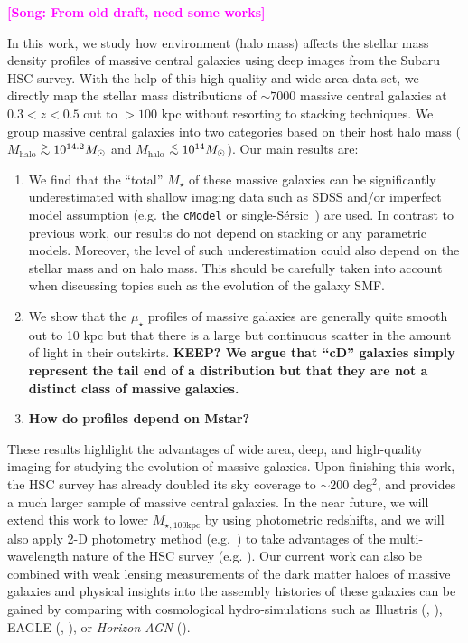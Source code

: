 \documentclass[a4paper,fleqn,usenatbib]{mnras}
\def\simlt{\lower.5ex\hbox{$\; \buildrel < \over {\sim} \;$}}
\def\simgt{\lower.5ex\hbox{$\; \buildrel > \over {\sim} \;$}}
\def\ser{{S\'{e}rsic\ }}
\def\mstar{{$M_{\star}$}}
\def\mhalo{{$M_{\mathrm{halo}}$}}
\def\mtot{{$M_{\star,100\mathrm{kpc}}$}}
\def\mden{{$\mu_{\star}$}}
\newcommand{\song}[1]{\textcolor{magenta}{\textbf{[Song: #1]}}}
\begin{document}
    \song{From old draft, need some works}
    
    In this work, we study how environment (halo mass) affects the stellar mass density 
    profiles of massive central galaxies using deep images from the Subaru HSC 
    survey. 
    With the help of this high-quality and wide area data set, we directly map the 
    stellar mass distributions of ${\sim}7000$ massive central galaxies at 
    $0.3 < z < 0.5$ out to $>100$ kpc without resorting to stacking techniques. 
    We group massive central galaxies into two categories based on their host halo 
    mass (\mhalo{}$\simgt 10^{14.2} M_{\odot}$ and \mhalo{}$\simlt 10^{14} M_{\odot}$). 
    Our main results are:  
    
    \begin{enumerate}
        \item We find that the ``total'' \mstar{} of these massive galaxies can be 
            significantly underestimated with shallow imaging data such as SDSS and/or 
            imperfect model assumption (e.g. the \texttt{cModel} or single-\ser{}) 
            are used. 
            In contrast to previous work, our results do not depend on stacking or any 
            parametric models. 
            Moreover, the level of such underestimation could also depend on the 
            stellar mass and on halo mass. 
            This should be carefully taken into account when discussing topics such 
            as the evolution of the galaxy SMF.
            
        \item We show that the \mden{} profiles of massive galaxies are generally quite 
            smooth out to 10 kpc but that there is a large but continuous scatter in the 
            amount of light in their outskirts. 
            {\bf KEEP? We argue that ``cD'' galaxies simply represent the tail end of a 
            distribution but that they are not a distinct class of massive galaxies.}
            
        \item {\bf How do profiles depend on Mstar?}
            
    \end{enumerate}

    These results highlight the advantages of wide area, deep, and high-quality imaging 
    for studying the evolution of massive galaxies. 
    Upon finishing this work, the HSC survey has already doubled its sky coverage to 
    ${\sim} 200$ deg$^2$, and provides a much larger sample of massive central galaxies. 
    In the near future, we will extend this work to lower \mtot{} by using photometric 
    redshifts, and we will also apply 2-D photometry method (e.g.\ \citealt{Huang2013a}) 
    to take advantages of the multi-wavelength nature of the HSC survey 
    (e.g. \citealt{Huang2016}). 
    Our current work can also be combined with weak lensing measurements of the dark 
    matter haloes of massive galaxies and physical insights into the assembly histories 
    of these galaxies can be gained by comparing with cosmological hydro-simulations 
    such as Illustris (\citealt{Vogelsberger2014}, \citealt{Genel2014}), 
    EAGLE (\citealt{Schaye2015}, \citealt{Crain2015}), or \textit{Horizon-AGN} 
    (\citealt{Dubois2014}).
\end{document}
